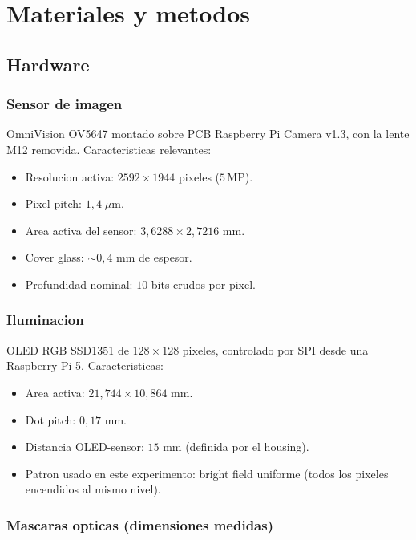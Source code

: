 \documentclass[11pt,a4paper,oneside]{report}
\begin{document}
\chapter{Materiales y metodos}

\section{Hardware}

\subsection{Sensor de imagen}

OmniVision OV5647 montado sobre PCB Raspberry Pi Camera v1.3, con la
lente M12 removida. Caracteristicas relevantes:

\begin{itemize}[leftmargin=2.2em]
  \item Resolucion activa: $2592 \times 1944$ pixeles ($5\,$MP).
  \item Pixel pitch: $1{,}4\;\mu$m.
  \item Area activa del sensor: $3{,}6288 \times 2{,}7216$ mm.
  \item Cover glass: $\sim 0{,}4$ mm de espesor.
  \item Profundidad nominal: $10$ bits crudos por pixel.
\end{itemize}

\subsection{Iluminacion}

OLED RGB SSD1351 de $128 \times 128$ pixeles, controlado por SPI desde
una Raspberry Pi 5. Caracteristicas:

\begin{itemize}[leftmargin=2.2em]
  \item Area activa: $21{,}744 \times 10{,}864$ mm.
  \item Dot pitch: $0{,}17$ mm.
  \item Distancia OLED-sensor: $15$ mm (definida por el housing).
  \item Patron usado en este experimento: bright field uniforme (todos
        los pixeles encendidos al mismo nivel).
\end{itemize}

\subsection{Mascaras opticas (dimensiones medidas)}
\end{document}
